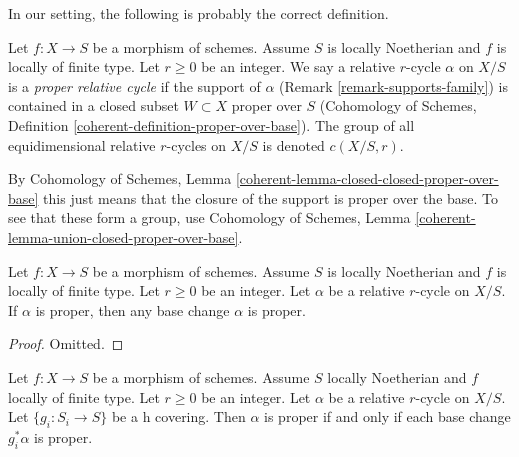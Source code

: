 \noindent
In our setting, the following is probably the correct definition.

\begin{definition}
\label{definition-proper}
Let $f : X \to S$ be a morphism of schemes. Assume $S$ is locally Noetherian
and $f$ is locally of finite type. Let $r \geq 0$ be an integer. We say a
relative $r$-cycle $\alpha$ on $X/S$ is a {\it proper relative cycle}
if the support of $\alpha$ (Remark \ref{remark-supports-family})
is contained in a closed subset $W \subset X$ proper over $S$
(Cohomology of Schemes, Definition \ref{coherent-definition-proper-over-base}).
The group of all equidimensional relative $r$-cycles on $X/S$ is
denoted $c(X/S, r)$.
\end{definition}

\noindent
By Cohomology of Schemes, Lemma
\ref{coherent-lemma-closed-closed-proper-over-base}
this just means that the closure of the support is proper over the base.
To see that these form a group, use
Cohomology of Schemes, Lemma \ref{coherent-lemma-union-closed-proper-over-base}.

\begin{lemma}
\label{lemma-proper-functoriality}
Let $f : X \to S$ be a morphism of schemes. Assume $S$ is locally Noetherian
and $f$ is locally of finite type. Let $r \geq 0$ be an integer. Let
$\alpha$ be a relative $r$-cycle on $X/S$. If $\alpha$ is proper,
then any base change $\alpha$ is proper.
\end{lemma}

\begin{proof}
Omitted.
\end{proof}

\begin{lemma}
\label{lemma-proper-h-descent}
Let $f : X \to S$ be a morphism of schemes. Assume $S$ locally Noetherian
and $f$ locally of finite type. Let $r \geq 0$ be an integer. Let $\alpha$
be a relative $r$-cycle on $X/S$. Let $\{g_i : S_i \to S\}$
be a h covering. Then $\alpha$ is proper
if and only if each base change $g_i^*\alpha$ is proper.
\end{lemma}

